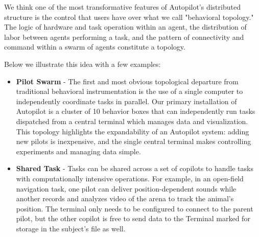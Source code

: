 We think one of the most transformative features of Autopilot's distributed structure is the control that users have over what we call "behavioral topology." The logic of hardware and task operation within an agent, the distribution of labor between agents performing a task, and the pattern of connectivity and command within a swarm of agents constitute a topology. 

Below we illustrate this idea with a few examples:

\clearpage

\begin{itemize}
    \item \textbf{Pilot Swarm} - The first and most obvious topological departure from traditional behavioral instrumentation is the use of a single computer to independently coordinate tasks in parallel. Our primary installation of Autopilot is a cluster of 10 behavior boxes that can independently run tasks dispatched from a central terminal which manages data and visualization. This topology highlights the expandability of an Autopilot system: adding new pilots is inexpensive, and the single central terminal makes controlling experiments and managing data simple.
    \item \textbf{Shared Task} -  Tasks can be shared across a set of copilots to handle tasks with computationally intensive operations. For example, in an open-field navigation task, one pilot can deliver position-dependent sounds while another records and analyzes video of the arena to track the animal's position. The terminal only needs to be configured to connect to the parent pilot, but the other copilot is free to send data to the Terminal marked for storage in the subject's file as well.

\end{itemize}
